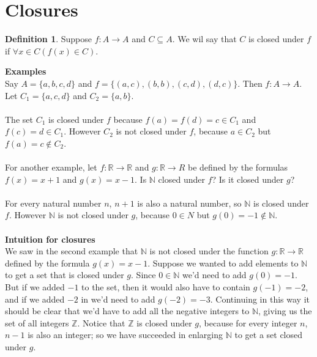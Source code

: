 \documentclass{report}
\theoremstyle{definition}
\newtheorem*{definition}{Definition}
\begin{document}
\section{Closures}
\begin{definition}
Suppose $f:A\to A$ and $C\subseteq A$. We wil say that $C$ is closed under $f$ if $\forall x\in C(f(x)\in C)$.
\end{definition}
\noindent\textbf{Examples}\\
Say $A=\{a,b,c,d\}$ and $f=\{(a,c),(b,b),(c,d),(d,c)\}$. Then $f:A\to A$.
Let $C_1=\{a,c,d\}$ and $C_2=\{a,b\}$.\\
\vspace{1mm}\\
The set $C_1$ is closed under $f$ because $f(a)=f(d)=c\in C_1$ and $f(c)=d\in C_1$. However $C_2$ is not closed under $f$, because $a\in C_2$ but $f(a)=c\notin C_2$.\\
\vspace{1mm}\\
For another example, let $f:\mathbb R\to\mathbb R$ and $g:\mathbb R\to R$ be defined by the formulas $f(x)=x+1$ and $g(x)=x-1$. Is $\mathbb N$ closed under $f$? Is it closed under $g$?\\
\vspace{1mm}\\
For every natural number $n$, $n+1$ is also a natural number, so $\mathbb N$ is closed under $f$. However $\mathbb N$ is not closed under $g$, because $0\in N$ but $g(0)=-1\notin\mathbb N$.\\
\vspace{1mm}\\
\textbf{Intuition for closures}\\
We saw in the second example that $\mathbb N$ is not closed under the function $g:\mathbb R\to\mathbb R$ defined by the formula $g(x)=x-1$. Suppose we wanted to add elements to $\mathbb N$ to get a
set that is closed under $g$. Since $0\in\mathbb N$ we'd need to add $g(0)=-1$. But if we added $-1$ to the set, then it would also have to contain $g(-1)=-2$, and if we added $-2$ in we'd 
need to add $g(-2)=-3$. Continuing in this way it should be clear that we'd have to add all the negative integers to $\mathbb N$, giving us the set of all integers $\mathbb Z$. Notice that 
$\mathbb Z$ is closed under $g$, because for every integer $n$, $n-1$ is also an integer; so we have succeeded in enlarging $\mathbb N$ to get a set closed under $g$.\\
\vspace{1mm}\\
\end{document}
